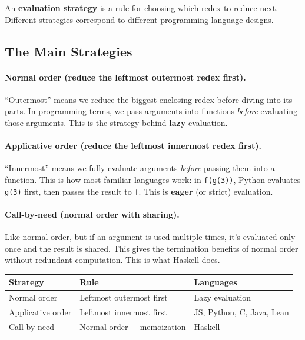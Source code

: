 \documentclass[11pt,a4paper]{article}
\theoremstyle{definition}
\begin{document}
An \textbf{evaluation strategy} is a rule for choosing which redex to reduce
next. Different strategies correspond to different programming language designs.

\subsection{The Main Strategies}

\paragraph{Normal order (reduce the leftmost outermost redex first).}
``Outermost'' means we reduce the biggest enclosing redex before diving into its
parts. In programming terms, we pass arguments into functions \emph{before}
evaluating those arguments. This is the strategy behind \textbf{lazy}
evaluation.

\paragraph{Applicative order (reduce the leftmost innermost redex first).}
``Innermost'' means we fully evaluate arguments \emph{before} passing them into
a function. This is how most familiar languages work: in \texttt{f(g(3))},
Python evaluates \texttt{g(3)} first, then passes the result to \texttt{f}.
This is \textbf{eager} (or strict) evaluation.

\paragraph{Call-by-need (normal order with sharing).}
Like normal order, but if an argument is used multiple times, it's evaluated
only once and the result is shared. This gives the termination benefits of
normal order without redundant computation. This is what Haskell does.

\begin{center}
\renewcommand{\arraystretch}{1.5}
\begin{tabular}{lll}
\textbf{Strategy} & \textbf{Rule} & \textbf{Languages} \\
\hline
Normal order     & Leftmost outermost first & Lazy evaluation \\
Applicative order & Leftmost innermost first & JS, Python, C, Java, Lean \\
Call-by-need     & Normal order + memoization & Haskell \\
\end{tabular}
\end{center}
\end{document}
